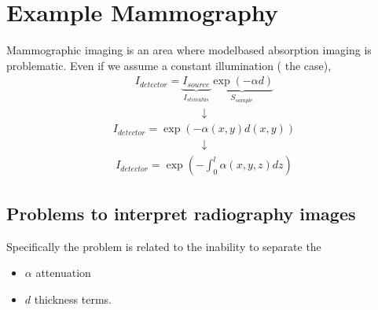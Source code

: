 \documentclass[letterpaper,10pt,english]{sphinxmanual}
\begin{document}
\noindent{}


\chapter{Example Mammography}
\label{\detokenize{04-BasicSegmentation:example-mammography}}
\sphinxAtStartPar
Mammographic imaging is an area where model\sphinxhyphen{}based absorption imaging is problematic. Even if we assume a constant illumination ( the case),
\begin{equation*}
\begin{split}I_{detector}=\underbrace{I_{source}}_{I_{stimulus}}\underbrace{\exp(-\alpha d)}_{S_{sample}}\end{split}
\end{equation*}\begin{equation*}
\begin{split}\downarrow\end{split}
\end{equation*}\begin{equation*}
\begin{split}I_{detector}=\exp(-\alpha(x,y) d(x,y))\end{split}
\end{equation*}\begin{equation*}
\begin{split}\downarrow\end{split}
\end{equation*}\begin{equation*}
\begin{split}I_{detector}=\exp\left(-\int_{0}^{l}\alpha(x,y, z) dz\right)\end{split}
\end{equation*}

\section{Problems to interpret radiography images}
\label{\detokenize{04-BasicSegmentation:problems-to-interpret-radiography-images}}
\sphinxAtStartPar
Specifically the problem is related to the inability to separate the
\begin{itemize}
\item {} 
\sphinxAtStartPar
\(\alpha\) \sphinxhyphen{} attenuation

\item {} 
\sphinxAtStartPar
\(d\) \sphinxhyphen{} thickness
terms.

\end{itemize}
\end{document}
